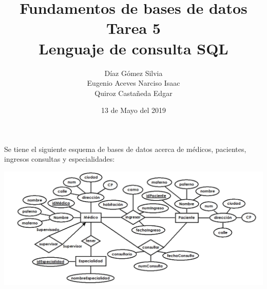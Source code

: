 \documentclass{article}
\begin{document}
    \title{
        Fundamentos de bases de datos \\
        Tarea 5 \\
        Lenguaje de consulta SQL
    }
    \author{
        Díaz Gómez Silvia \\
        Eugenio Aceves Narciso Isaac \\
        Quiroz Castañeda Edgar
    }
    \date {
        13 de Mayo del 2019    
    }
    \maketitle
    Se tiene el siguiente esquema de bases de datos acerca de médicos, pacientes, ingresos consultas y
    especialidades:\\
    
   \begin{center}
   	\includegraphics[width=1\textwidth]{img.JPG}
   \end{center}
    
\end{document}
